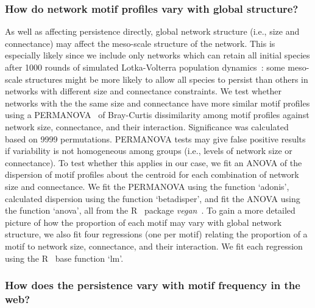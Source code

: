 \documentclass[12pt]{article}
\begin{document}
\begin{spacing}{2.0}
        
        \subsubsection*{How do network motif profiles vary with global structure?}
        
            As well as affecting persistence directly, global network structure (i.e., size and connectance) may affect the meso-scale structure of the network.
            This is especially likely since we include only networks which can retain all initial species after 1000 rounds of simulated Lotka-Volterra population dynamics~\citep{Cirtwill2021_inprep}:  some meso-scale structures might be more likely to allow all species to persist than others in networks with different size and connectance constraints.
            We test whether networks with the the same size and connectance have more similar motif profiles using a PERMANOVA~\citep{Anderson2001} of Bray-Curtis dissimilarity among motif profiles against network size, connectance, and their interaction.
            Significance was calculated based on 9999 permutations.
            PERMANOVA tests may give false positive results if variability is not homogeneous among groups (i.e., levels of network size or connectance).
            To test whether this applies in our case, we fit an ANOVA of the dispersion of motif profiles about the centroid for each combination of network size and connectance. 
            We fit the PERMANOVA using the function `adonis', calculated dispersion using the function `betadisper', and fit the ANOVA using the function `anova', all from the R~\citep{R} package \emph{vegan}~\citep{vegan}.
            To gain a more detailed picture of how the proportion of each motif may vary with global network structure, we also fit four regressions (one per motif) relating the proportion of a motif to network size, connectance, and their interaction.
            We fit each regression using the R~\citep{R} base function `lm'.
            
        
        \subsubsection*{How does the persistence vary with motif frequency in the web?}


\end{spacing}
\end{document}
